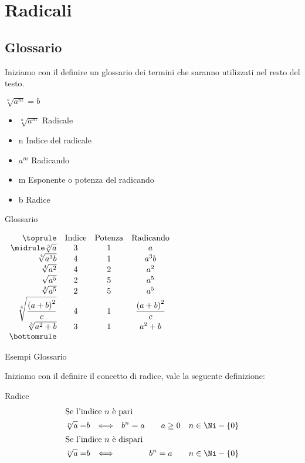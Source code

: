 \chapter{Radicali}
\label{Radicaliradici}
\section{Glossario}Iniziamo con il definire un glossario dei termini che saranno utilizzati nel resto del testo.
\begin{table}[H]
\centering
$\sqrt[n]{a^m}=b$
\begin{itemize}
\item $\sqrt[n]{a^m}$ Radicale
\item n Indice del radicale
\item $a^m$ Radicando
\item m Esponente o potenza del radicando
\item b Radice
\end{itemize}
\caption{Glossario}
\label{tab:RadicaliGlossario}
\end{table}
\begin{table}[H]
\centering
$
\begin{array}{rccc}
\toprule
 &\text{Indice} & \text{Potenza} & \text{Radicando} \\ 
 \midrule
 \sqrt[3]{a}& 3 &1  & a \\ 
 \sqrt[4]{a^3b}& 4 &1  & a^3b \\ 
 \sqrt[4]{a^2}& 4 &2  & a^2 \\
\sqrt{a^5}& 2 &5 & a^5 \\ 
\sqrt[2]{a^5}& 2 &5 & a^5 \\ 
\sqrt[4]{\dfrac{\left( a+b\right)^2 }{c}}& 4 &1 &\dfrac{\left( a+b\right)^2 }{c} \\
\sqrt[3]{a^2+b}& 3 &1 & a^2+b\\
\bottomrule	
\end{array}
$ 
\label{tab:esempiglossario}
\caption{Esempi Glossario}
\end{table}
Iniziamo con il definire il concetto di radice, vale la seguente definizione:
\begin{definizionet}{Radice}{}
	\begin{align*}
	\intertext{Se l'indice  $n$ è pari}
	\sqrt[n]{a}=&b&\Longleftrightarrow&&b^n=a\qquad a\geq 0\quad  n\in\Ni-\lbrace0\rbrace\\
	\intertext{Se l'indice  $n$ è dispari}
	\sqrt[n]{a}=&b&\Longleftrightarrow&&b^n=a\qquad n\in\Ni-\lbrace0\rbrace\\
	\end{align*}
\end{definizionet}
